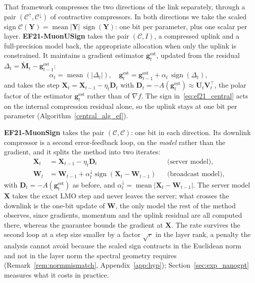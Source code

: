 That framework compresses the two directions of the link separately, through a pair $(\mathcal{C}^{\uparrow},\mathcal{C}^{\downarrow})$ of contractive compressors. In both directions we take the scaled sign $\mathcal{C}(\mathbf{Y}) = \operatorname{mean}|\mathbf{Y}|\,\operatorname{sign}(\mathbf{Y})$: one bit per parameter, plus one scalar per layer. \textbf{EF21-MuonUSign} takes the pair $(\mathcal{C},I)$, a compressed uplink and a full-precision model back, the appropriate allocation when only the uplink is constrained. It maintains a gradient estimator $\mathbf{g}_t^{\mathrm{est}}$, updated from the residual $\Delta_t = \tilde{\mathbf{M}}_t - \mathbf{g}_{t-1}^{\mathrm{est}}$:
\begin{equation}
\alpha_t = \operatorname{mean}(|\Delta_t|),\quad
\mathbf{g}_{t}^{\mathrm{est}} = \mathbf{g}_{t-1}^{\mathrm{est}} + \alpha_t\,\operatorname{sign}(\Delta_t),
\label{eq:ef21_central}
\end{equation}
and takes the step $\mathbf{X}_{t} = \mathbf{X}_{t-1} - \eta_t\mathbf{D}_t$ with $\mathbf{D}_t = -A(\mathbf{g}_{t}^{\mathrm{est}}) \approx \mathbf{U}_{t}\mathbf{V}^\top_{t}$, the polar factor of the estimator $\mathbf{g}_t^{\mathrm{est}}$ rather than of $\nabla f$. The sign in~\eqref{eq:ef21_central} acts on the internal compression residual alone, so the uplink stays at one bit per parameter (Algorithm~\ref{central_alg_ef}).

\textbf{EF21-MuonSign} takes the pair $(\mathcal{C},\mathcal{C})$: one bit in each direction. Its downlink compressor is a second error-feedback loop, on the \emph{model} rather than the gradient, and it splits the method into two iterates:
\begin{equation}\label{eq:two_models}
\begin{aligned}
  \mathbf{X}_{t}&=\mathbf{X}_{t-1}-\eta_t\mathbf{D}_t &&\text{(server model)},\\
  \mathbf{W}_{t}&=\mathbf{W}_{t-1}+\alpha_t^{\downarrow}\operatorname{sign}(\mathbf{X}_{t}-\mathbf{W}_{t-1}) &&\text{(broadcast model)},
\end{aligned}
\end{equation}
with $\mathbf{D}_t=-A(\mathbf{g}_{t}^{\mathrm{est}})$ as before, and $\alpha_t^{\downarrow}=\operatorname{mean}|\mathbf{X}_t-\mathbf{W}_{t-1}|$. The server model $\mathbf{X}$ takes the exact LMO step and never leaves the server; what crosses the downlink is the one-bit update of $\mathbf{W}$, the only model the rest of the method observes, since gradients, momentum and the uplink residual are all computed there, whereas the guarantee bounds the gradient at $\mathbf{X}$. The rate survives the second loop at a step size smaller by a factor $\sqrt{r}$ in the layer rank, a penalty the analysis cannot avoid because the scaled sign contracts in the Euclidean norm and not in the layer norm the spectral geometry requires (Remark~\ref{rem:normmismatch}, Appendix~\ref{app:hyp}); Section~\ref{sec:exp_nanogpt} measures what it costs in practice.

